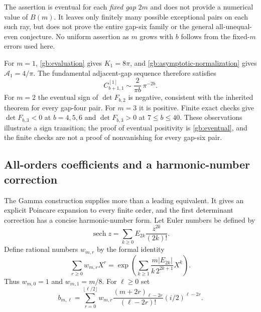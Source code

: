 \begin{remark}\label{gb:scope}
The assertion is eventual for each \emph{fixed gap} $2m$ and
does not provide a numerical value of $B(m)$.  It leaves only
finitely many possible exceptional pairs on each such ray, but
does not prove the entire gap-six family or the general
all-unequal-even conjecture.  No uniform assertion as $m$ grows
with $b$ follows from the fixed-$m$ errors used here.
\end{remark}

For $m=1$, \eqref{gb:evaluation} gives $K_1=8\pi$, and
\eqref{gb:asymptotic-normalization} gives $\mathcal A_1=4/\pi$.
The fundamental adjacent-gap sequence therefore satisfies
\[
        C^{[1]}_{b+1,1}\sim\frac{2}{\pi b}\,\pi^{-2b}.
\]
For $m=2$ the eventual sign of $\det F_{b,2}$ is negative,
consistent with the inherited theorem for every gap-four pair.
For $m=3$ it is positive.  Finite exact checks give
$\det F_{b,3}<0$ at $b=4,5,6$ and $\det F_{b,3}>0$ at
$7\le b\le40$.  These observations illustrate a sign transition;
the proof of eventual positivity is \cref{gb:eventual}, and the
finite checks are not a proof of nonvanishing for every gap-six pair.

\subsection{All-orders coefficients and a harmonic-number correction}

The Gamma construction supplies more than a leading equivalent.
It gives an explicit Poincare expansion to every finite order,
and the first determinant correction has a concise harmonic-number
form.  Let Euler numbers be defined by
\[
                \operatorname{sech}z=
                \sum_{k\ge0}E_{2k}\frac{z^{2k}}{(2k)!}.
\]
Define rational numbers $w_{m,r}$ by the formal identity
\begin{equation}\label{gb:w-series}
 \sum_{r\ge0}w_{m,r}X^r
   =\exp\!\left(\sum_{k\ge1}
            \frac{m|E_{2k}|}{k\,2^{2k+1}}X^k\right).
\end{equation}
Thus $w_{m,0}=1$ and $w_{m,1}=m/8$.
For $\ell\ge0$ set
\begin{equation}\label{gb:b-coefficients}
 b_{m,\ell}=\sum_{r=0}^{\lfloor\ell/2\rfloor}
  w_{m,r}\frac{(m+2r)_{\ell-2r}}{(\ell-2r)!}
                     (i/2)^{\ell-2r}.
\end{equation}

